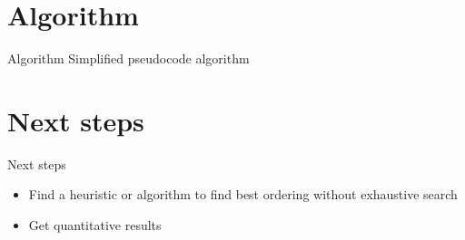 \documentclass{beamer}
\begin{document}
\section{Algorithm}
\begin{frame}{Algorithm}
Simplified pseudocode algorithm
\end{frame}

\section{Next steps}
\begin{frame}{Next steps}
\begin{itemize}
    \item Find a heuristic or algorithm to find best ordering without exhaustive search
    \item Get quantitative results
\end{itemize}
\end{frame}
\end{document}
